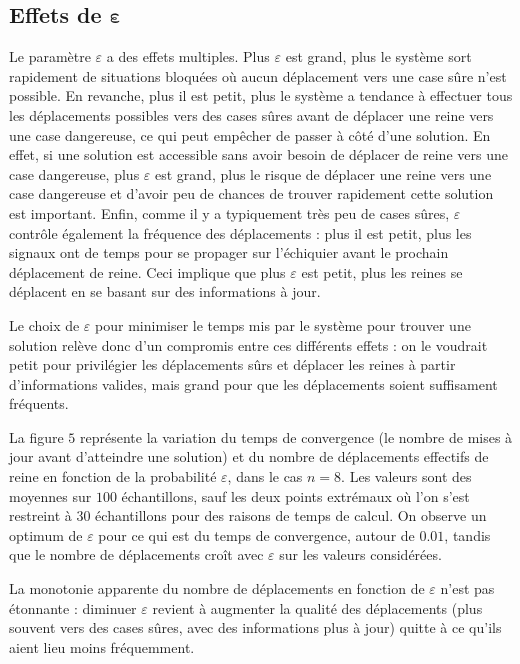 \documentclass[11pt, openany]{article}
\begin{document}
\subsection*{Effets de $\boldsymbol \varepsilon$}



Le paramètre $\varepsilon$ a des effets multiples. Plus $\varepsilon$ est grand, plus le système sort rapidement de situations bloquées où aucun déplacement vers une case sûre n'est possible. En revanche, plus il est petit, plus le système a tendance à effectuer tous les déplacements possibles vers des cases sûres avant de déplacer une reine vers une case dangereuse, ce qui peut empêcher de passer à côté d'une solution. En effet, si une solution est accessible sans avoir besoin de déplacer de reine vers une case dangereuse, plus $\varepsilon$ est grand, plus le risque de déplacer une reine vers une case dangereuse et d'avoir peu de chances de trouver rapidement cette solution est important. Enfin, comme il y a typiquement très peu de cases sûres, $\varepsilon$ contrôle également la fréquence des déplacements : plus il est petit, plus les signaux ont de temps pour se propager sur l'échiquier avant le prochain déplacement de reine. Ceci implique que plus $\varepsilon$ est petit, plus les reines se déplacent en se basant sur des informations à jour. 

Le choix de $\varepsilon$ pour minimiser le temps mis par le système pour trouver une solution relève donc d'un compromis entre ces différents effets : on le voudrait petit pour privilégier les déplacements sûrs et déplacer les reines à partir d'informations valides, mais grand pour que les déplacements soient suffisament fréquents.

La figure $5$ représente la variation du temps de convergence (le nombre de mises à jour avant d'atteindre une solution) et du nombre de déplacements effectifs de reine en fonction de la probabilité $\varepsilon$, dans le cas $n=8$. Les valeurs sont des moyennes sur $100$ échantillons, sauf les deux points extrémaux où l'on s'est restreint à $30$ échantillons pour des raisons de temps de calcul. On observe un optimum de $\varepsilon$ pour ce qui est du temps de convergence, autour de $0.01$, tandis que le nombre de déplacements croît avec $\varepsilon$ sur les valeurs considérées. 

La monotonie apparente du nombre de déplacements en fonction de $\varepsilon$ n'est pas étonnante : diminuer $\varepsilon$ revient à augmenter la qualité des déplace\-ments (plus souvent vers des cases sûres, avec des informations plus à jour) quitte à ce qu'ils aient lieu moins fréquemment.
\end{document}
